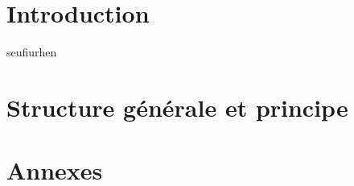\documentclass[french]{layout/Report}
\begin{document}

\newpage

\newpage\null\thispagestyle{empty}\newpage

\tableofcontents

\newpage

\section{Introduction}
seufiurhen

\newpage
\section{Structure générale et principe}

\newpage
\vfill
\pagebreak

\section{Annexes}
\end{document}

